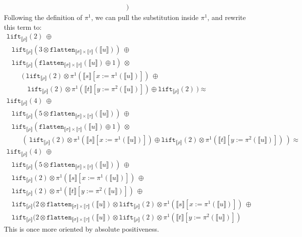 \documentclass[a4paper,UKenglish,cleveref,autoref,numberwithinsect]{lipics-v2019}
\theoremstyle{definition}
\newcommand{\flatten}{\mathtt{flatten}}
\newcommand{\lift}{\mathtt{lift}}
\newcommand{\typeinterpret}[1]{\llbracket #1 \rrbracket}
\newcommand{\interpret}[1]{\llbracket #1 \rrbracket}
\begin{document}
\begin{itemize}
\[\begin{array}{l}
    \ )
  \end{array}
  \]
  Following the definition of $\pi^1$, we can pull the substitution
  inside $\pi^1$, and rewrite this term to:
  \[
  \begin{array}{l}
  \lift_{\typeinterpret{\rho}}(2)\ \oplus \\
  \phantom{A}
    \lift_{\typeinterpret{\rho}}(3 \otimes
    \flatten_{\typeinterpret{\sigma} \times \typeinterpret{\tau}}(
    \interpret{u}))\ \oplus \\
  \phantom{A}
    \lift_{\typeinterpret{\rho}}(
    \flatten_{\typeinterpret{\sigma} \times \typeinterpret{\tau}}(
    \interpret{u}) \oplus 1)\ \otimes \\
  \phantom{ABC}
    (\ \lift_{\typeinterpret{\rho}}(2) \otimes \pi^1(\interpret{s}[
    x:=\pi^1(\interpret{u})])\ \oplus \\
  \phantom{ABCD}
    \lift_{\typeinterpret{\rho}}(2) \otimes \pi^1(\interpret{t}[
    y:=\pi^2(\interpret{u})]) \oplus \lift_{\typeinterpret{\rho}}(2)
    \ ) \approx \\
  \lift_{\typeinterpret{\rho}}(4)\ \oplus \\
  \phantom{A}
    \lift_{\typeinterpret{\rho}}(5 \otimes
    \flatten_{\typeinterpret{\sigma} \times \typeinterpret{\tau}}(
    \interpret{u}))\ \oplus \\
  \phantom{A}
    \lift_{\typeinterpret{\rho}}(
    \flatten_{\typeinterpret{\sigma} \times \typeinterpret{\tau}}(
    \interpret{u}) \oplus 1)\ \otimes \\
  \phantom{ABC}
    (\ \lift_{\typeinterpret{\rho}}(2) \otimes \pi^1(\interpret{s}[
    x:=\pi^1(\interpret{u})]) \oplus
    \lift_{\typeinterpret{\rho}}(2) \otimes \pi^1(\interpret{t}[
    y:=\pi^2(\interpret{u})])
    \ ) \approx \\
  \lift_{\typeinterpret{\rho}}(4)\ \oplus \\
  \phantom{A}
    \lift_{\typeinterpret{\rho}}(5 \otimes
    \flatten_{\typeinterpret{\sigma} \times \typeinterpret{\tau}}(
    \interpret{u}))\ \oplus \\
  \phantom{A}
    \lift_{\typeinterpret{\rho}}(2) \otimes \pi^1(\interpret{s}[
    x:=\pi^1(\interpret{u})])\ \oplus \\
  \phantom{A}
    \lift_{\typeinterpret{\rho}}(2) \otimes \pi^1(\interpret{t}[
    y:=\pi^2(\interpret{u})])\ \oplus \\
  \phantom{A}
    \lift_{\typeinterpret{\rho}}(2 \otimes
    \flatten_{\typeinterpret{\sigma} \times \typeinterpret{\tau}}(
    \interpret{u}) \otimes
    \lift_{\typeinterpret{\rho}}(2) \otimes \pi^1(\interpret{s}[
    x:=\pi^1(\interpret{u})])\ \oplus \\
  \phantom{A}
    \lift_{\typeinterpret{\rho}}(2 \otimes
    \flatten_{\typeinterpret{\sigma} \times \typeinterpret{\tau}}(
    \interpret{u}) \otimes
    \lift_{\typeinterpret{\rho}}(2) \otimes \pi^1(\interpret{t}[
    y:=\pi^2(\interpret{u})])
  \end{array}
  \]
  This is once more oriented by absolute positiveness.


\end{itemize}
\end{document}
